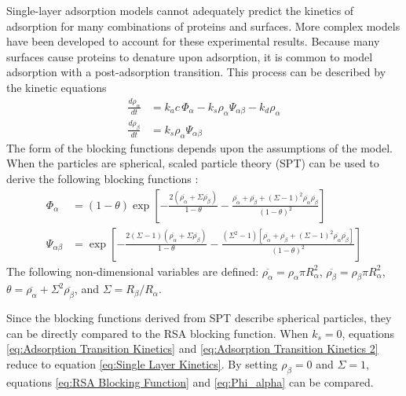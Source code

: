 Single-layer adsorption models cannot adequately predict the kinetics
of adsorption for many combinations of proteins and surfaces. More
complex models have been developed to account for these experimental
results. Because many surfaces cause proteins to denature upon adsorption,
it is common to model adsorption with a post-adsorption transition.
This process can be described by the kinetic equations\begin{align}
\frac{d\rho_{\alpha}}{dt} & =k_{a}c\,\Phi_{\alpha}-k_{s}\rho_{\alpha}\Psi_{\alpha\beta}-k_{d}\rho_{\alpha}\label{eq:Adsorption Transition Kinetics}\\
\frac{d\rho_{\beta}}{dt} & =k_{s}\rho_{\alpha}\Psi_{\alpha\beta}\label{eq:Adsorption Transition Kinetics 2}\end{align}
The form of the blocking functions depends upon the assumptions of
the model. When the particles are spherical, scaled particle theory
(SPT) can be used to derive the following blocking functions \cite{Brusatori1999}:
\begin{align}
\Phi_{\alpha} & =\left(1-\theta\right)\exp\left[-\frac{2\left(\overline{\rho_{\alpha}}+\Sigma\overline{\rho_{\beta}}\right)}{1-\theta}-\frac{\overline{\rho_{\alpha}}+\overline{\rho_{\beta}}+\left(\Sigma-1\right)^{2}\overline{\rho_{\alpha}}\overline{\rho_{\beta}}}{\left(1-\theta\right)^{2}}\right]\label{eq:Phi_alpha}\\
\Psi_{\alpha\beta} & =\exp\left[-\frac{2\left(\Sigma-1\right)\left(\overline{\rho_{\alpha}}+\Sigma\overline{\rho_{\beta}}\right)}{1-\theta}-\frac{\left(\Sigma^{2}-1\right)\left[\overline{\rho_{\alpha}}+\overline{\rho_{\beta}}+\left(\Sigma-1\right)^{2}\overline{\rho_{\alpha}}\overline{\rho_{\beta}}\right]}{\left(1-\theta\right)^{2}}\right]\label{eq:Psi_alpha_beta}\end{align}
The following non-dimensional variables are defined: $\overline{\rho_{\alpha}}=\rho_{\alpha}\pi R_{\alpha}^{2}$,
$\overline{\rho_{\beta}}=\rho_{\beta}\pi R_{\alpha}^{2}$, $\theta=\overline{\rho_{\alpha}}+\Sigma^{2}\overline{\rho_{\beta}}$,
and $\Sigma=R_{\beta}/R_{\alpha}$.

Since the blocking functions derived from SPT describe spherical particles,
they can be directly compared to the RSA blocking function. When $k_{s}=0$,
equations \ref{eq:Adsorption Transition Kinetics} and \ref{eq:Adsorption Transition Kinetics 2}
reduce to equation \ref{eq:Single Layer Kinetics}. By setting $\rho_{\beta}=0$
and $\Sigma=1$, equations \ref{eq:RSA Blocking Function} and \ref{eq:Phi_alpha}
can be compared.

